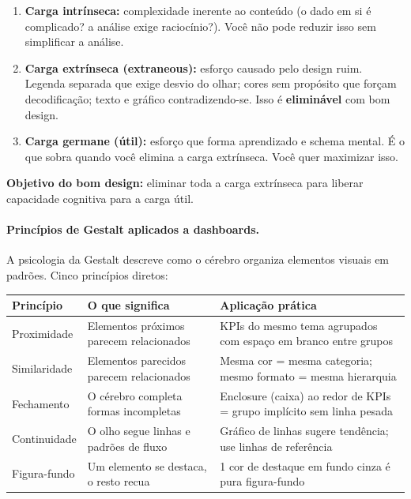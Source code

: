 \begin{BoardBox}[title=Os 3 Tipos de Carga Cognitiva]
\begin{enumerate}
  \item \textbf{Carga intrínseca:} complexidade inerente ao conteúdo (o dado em si é complicado? a análise exige raciocínio?). Você não pode reduzir isso sem simplificar a análise.
  \item \textbf{Carga extrínseca (extraneous):} esforço causado pelo design ruim. Legenda separada que exige desvio do olhar; cores sem propósito que forçam decodificação; texto e gráfico contradizendo-se. Isso é \textbf{eliminável} com bom design.
  \item \textbf{Carga germane (útil):} esforço que forma aprendizado e schema mental. É o que sobra quando você elimina a carga extrínseca. Você quer maximizar isso.
\end{enumerate}
\smallskip
\textbf{Objetivo do bom design:} eliminar toda a carga extrínseca para liberar capacidade cognitiva para a carga útil.
\end{BoardBox}

\paragraph{Princípios de Gestalt aplicados a dashboards.}
A psicologia da Gestalt descreve como o cérebro organiza elementos visuais em padrões. Cinco princípios diretos:

\begin{BoardBox}[title=Gestalt em Dashboards]
\begin{tabular}{@{}lp{4.2cm}p{5.8cm}@{}}
\toprule
\textbf{Princípio} & \textbf{O que significa} & \textbf{Aplicação prática} \\
\midrule
Proximidade   & Elementos próximos parecem relacionados  & KPIs do mesmo tema agrupados com espaço em branco entre grupos \\
Similaridade  & Elementos parecidos parecem relacionados & Mesma cor = mesma categoria; mesmo formato = mesma hierarquia \\
Fechamento    & O cérebro completa formas incompletas    & Enclosure (caixa) ao redor de KPIs = grupo implícito sem linha pesada \\
Continuidade  & O olho segue linhas e padrões de fluxo  & Gráfico de linhas sugere tendência; use linhas de referência \\
Figura-fundo  & Um elemento se destaca, o resto recua   & 1 cor de destaque em fundo cinza é pura figura-fundo \\
\bottomrule
\end{tabular}
\end{BoardBox}

